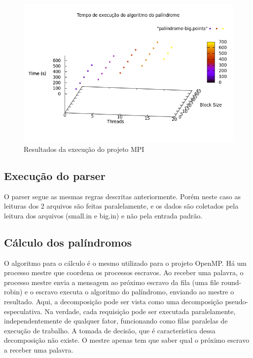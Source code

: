 \documentclass[a4paper]{article}
\begin{document}
\begin{figure}[float=p]
	\includegraphics[scale=0.5]{graph-mpi}
	\caption{Resultados da execução do projeto MPI}
	\label{graph-mpi}
\end{figure}

\subsection{Execução do parser}
\indent \indent O parser segue as mesmas regras descritas anteriormente. Porém neste caso as leituras dos 2 arquivos são feitas paralelamente, e os dados são coletados pela leitura dos arquivos (small.in e big.in) e não pela entrada padrão.

\subsection{Cálculo dos palíndromos}
\indent \indent O algoritmo para o cálculo é o mesmo utilizado para o projeto OpenMP. Há um processo mestre que coordena os processos escravos. Ao receber uma palavra, o processo mestre envia a mensagem ao próximo escravo da fila (uma file round-robin) e o escravo executa o algoritmo do palíndromo, enviando ao mestre o resultado. Aqui, a decomposição pode ser vista como uma decomposição pseudo-especulativa. Na verdade, cada requisição pode ser executada paralelamente, independentemente de qualquer fator, funcionando como filas paralelas de execução de trabalho. A tomada de decisão, que é característica dessa decomposição não existe. O mestre apenas tem que saber qual o próximo escravo a receber uma palavra.
\end{document}
